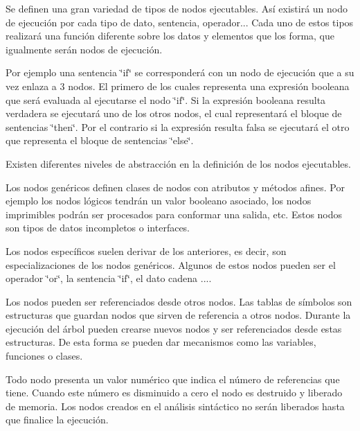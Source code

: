 Se definen una gran variedad de tipos de nodos ejecutables. Así existirá un nodo de ejecución por cada tipo de dato, sentencia, operador... Cada uno de estos tipos realizará una función diferente sobre los datos y elementos que los forma, que igualmente serán nodos de ejecución.

Por ejemplo una sentencia \char`\"{}if\char`\"{} se corresponderá con un nodo de ejecución que a su vez enlaza a 3 nodos. El primero de los cuales representa una expresión booleana que será evaluada al ejecutarse el nodo \char`\"{}if\char`\"{}. Si la expresión booleana resulta verdadera se ejecutará uno de los otros nodos, el cual representará el bloque de sentencias \char`\"{}then\char`\"{}. Por el contrario si la expresión resulta falsa se ejecutará el otro que representa el bloque de sentencias \char`\"{}else\char`\"{}.

Existen diferentes niveles de abstracción en la definición de los nodos ejecutables.

Los nodos genéricos definen clases de nodos con atributos y métodos afines. Por ejemplo los nodos lógicos tendrán un valor booleano asociado, los nodos imprimibles podrán ser procesados para conformar una salida, etc. Estos nodos son tipos de datos incompletos o interfaces.

Los nodos específicos suelen derivar de los anteriores, es decir, son especializaciones de los nodos genéricos. Algunos de estos nodos pueden ser el operador \char`\"{}or\char`\"{}, la sentencia \char`\"{}if\char`\"{}, el dato cadena ....

Los nodos pueden ser referenciados desde otros nodos. Las tablas de símbolos son estructuras que guardan nodos que sirven de referencia a otros nodos. Durante la ejecución del árbol pueden crearse nuevos nodos y ser referenciados desde estas estructuras. De esta forma se pueden dar mecanismos como las variables, funciones o clases.

Todo nodo presenta un valor numérico que indica el número de referencias que tiene. Cuando este número es disminuido a cero el nodo es destruido y liberado de memoria. Los nodos creados en el análisis sintáctico no serán liberados hasta que finalice la ejecución. 

